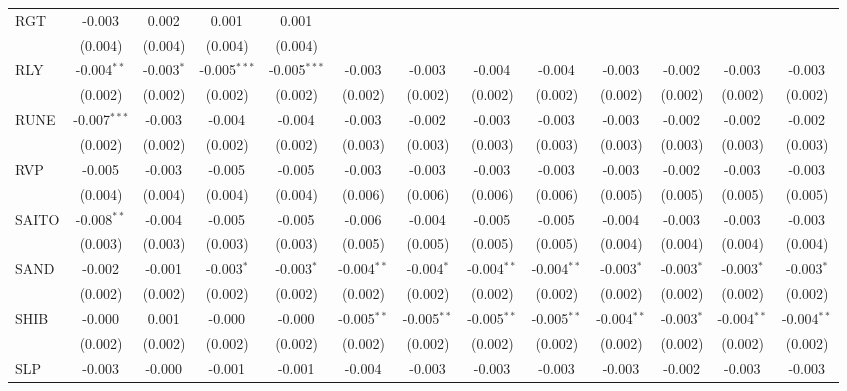 \begin{table}[!htbp]
\begin{tabular}{@{\extracolsep{5pt}}lcccccccccccc}
 RGT & -0.003$^{}$ & 0.002$^{}$ & 0.001$^{}$ & 0.001$^{}$ & & & & & & & & \\
  & (0.004) & (0.004) & (0.004) & (0.004) & & & & & & & & \\
 RLY & -0.004$^{**}$ & -0.003$^{*}$ & -0.005$^{***}$ & -0.005$^{***}$ & -0.003$^{}$ & -0.003$^{}$ & -0.004$^{}$ & -0.004$^{}$ & -0.003$^{}$ & -0.002$^{}$ & -0.003$^{}$ & -0.003$^{}$ \\
  & (0.002) & (0.002) & (0.002) & (0.002) & (0.002) & (0.002) & (0.002) & (0.002) & (0.002) & (0.002) & (0.002) & (0.002) \\
 RUNE & -0.007$^{***}$ & -0.003$^{}$ & -0.004$^{}$ & -0.004$^{}$ & -0.003$^{}$ & -0.002$^{}$ & -0.003$^{}$ & -0.003$^{}$ & -0.003$^{}$ & -0.002$^{}$ & -0.002$^{}$ & -0.002$^{}$ \\
  & (0.002) & (0.002) & (0.002) & (0.002) & (0.003) & (0.003) & (0.003) & (0.003) & (0.003) & (0.003) & (0.003) & (0.003) \\
 RVP & -0.005$^{}$ & -0.003$^{}$ & -0.005$^{}$ & -0.005$^{}$ & -0.003$^{}$ & -0.003$^{}$ & -0.003$^{}$ & -0.003$^{}$ & -0.003$^{}$ & -0.002$^{}$ & -0.003$^{}$ & -0.003$^{}$ \\
  & (0.004) & (0.004) & (0.004) & (0.004) & (0.006) & (0.006) & (0.006) & (0.006) & (0.005) & (0.005) & (0.005) & (0.005) \\
 SAITO & -0.008$^{**}$ & -0.004$^{}$ & -0.005$^{}$ & -0.005$^{}$ & -0.006$^{}$ & -0.004$^{}$ & -0.005$^{}$ & -0.005$^{}$ & -0.004$^{}$ & -0.003$^{}$ & -0.003$^{}$ & -0.003$^{}$ \\
  & (0.003) & (0.003) & (0.003) & (0.003) & (0.005) & (0.005) & (0.005) & (0.005) & (0.004) & (0.004) & (0.004) & (0.004) \\
 SAND & -0.002$^{}$ & -0.001$^{}$ & -0.003$^{*}$ & -0.003$^{*}$ & -0.004$^{**}$ & -0.004$^{*}$ & -0.004$^{**}$ & -0.004$^{**}$ & -0.003$^{*}$ & -0.003$^{*}$ & -0.003$^{*}$ & -0.003$^{*}$ \\
  & (0.002) & (0.002) & (0.002) & (0.002) & (0.002) & (0.002) & (0.002) & (0.002) & (0.002) & (0.002) & (0.002) & (0.002) \\
 SHIB & -0.000$^{}$ & 0.001$^{}$ & -0.000$^{}$ & -0.000$^{}$ & -0.005$^{**}$ & -0.005$^{**}$ & -0.005$^{**}$ & -0.005$^{**}$ & -0.004$^{**}$ & -0.003$^{*}$ & -0.004$^{**}$ & -0.004$^{**}$ \\
  & (0.002) & (0.002) & (0.002) & (0.002) & (0.002) & (0.002) & (0.002) & (0.002) & (0.002) & (0.002) & (0.002) & (0.002) \\
 SLP & -0.003$^{}$ & -0.000$^{}$ & -0.001$^{}$ & -0.001$^{}$ & -0.004$^{}$ & -0.003$^{}$ & -0.003$^{}$ & -0.003$^{}$ & -0.003$^{}$ & -0.002$^{}$ & -0.003$^{}$ & -0.003$^{}$ \\

\end{tabular}
\end{table}
